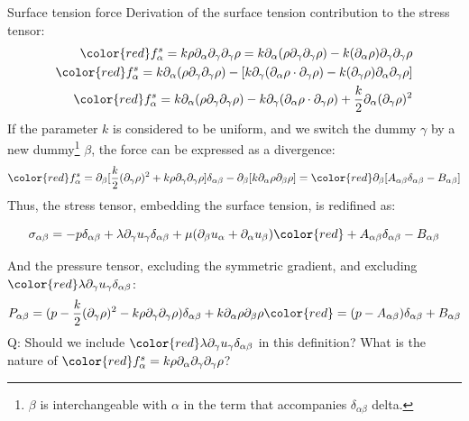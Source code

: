 \documentclass[8pt]{beamer}
\newcommand{\kronecker}{\delta_{\alpha \beta}}
\begin{document}
	\begin{frame}[t]{Surface tension force}
		Derivation of the surface tension contribution to the stress tensor: 
		\begin{equation*}
			\begin{split}
				{\color{red} f^s_\alpha} = k \rho \partial_\alpha \partial_\gamma \partial_\gamma \rho = k  \partial_\alpha (\rho \partial_\gamma \partial_\gamma \rho) - k (\partial_\alpha \rho) \partial_\gamma \partial_\gamma \rho\\
					 {\color{red} f^s_\alpha} = k  \partial_\alpha (\rho \partial_\gamma \partial_\gamma \rho) - [ k \partial_\gamma (\partial_\alpha \rho \cdot  \partial_\gamma \rho) - k (\partial_\gamma \rho) \partial_\alpha \partial_\gamma \rho  ]\\
					 {\color{red} f^s_\alpha} = k  \partial_\alpha (\rho \partial_\gamma \partial_\gamma \rho) - k \partial_\gamma (\partial_\alpha \rho \cdot  \partial_\gamma \rho) + \frac{k}{2} \partial_\alpha (\partial_\gamma \rho)^2
			\end{split}
		\end{equation*}
		If the parameter $k$ is considered to be uniform, and we switch the dummy $\gamma$ by a new dummy\footnote{$\beta$ is interchangeable with $\alpha$ in the term that accompanies $\kronecker$ delta.} $\beta$, the force can be expressed as a divergence: 
		\begin{equation*}
			\begin{split}
			 {\color{red} f^s_\alpha} = \partial_\beta [\frac{k}{2}(\partial_\gamma \rho)^2 + k \rho \partial_\gamma \partial_\gamma \rho ] \kronecker - \partial_\beta [k \partial_\alpha \rho \partial_\beta \rho] =
			  {\color{red} \partial_\beta [A_{\alpha\beta} \kronecker - B_{\alpha\beta}]} 
			\end{split}
		\end{equation*}
		Thus, the stress tensor, embedding the surface tension, is redifined as:
		
		\begin{equation*}
			\sigma_{\alpha\beta} = -p \kronecker + \lambda \partial_\gamma u_\gamma \kronecker + \mu (\partial_\beta u_\alpha + \partial_\alpha u_\beta) \color{red} + A_{\alpha\beta} \kronecker - B_{\alpha\beta}
		\end{equation*}
		 
		 And the pressure tensor, excluding the symmetric gradient, and excluding $ \color{red} \lambda \partial_\gamma u_\gamma \kronecker$:
		 \begin{equation*}
		 	P_{\alpha\beta} = (p - \frac{k}{2}(\partial_\gamma \rho)^2 - k \rho \partial_\gamma \partial_\gamma \rho) \kronecker + k \partial_\alpha \rho \partial_\beta \rho  \color{red} = (p-A_{\alpha\beta}) \kronecker + B_{\alpha\beta}
		 \end{equation*}
	 	Q: Should we include $ \color{red} \lambda \partial_\gamma u_\gamma \kronecker$ in this definition? What is the nature of ${\color{red} f^s_\alpha} = k \rho \partial_\alpha \partial_\gamma \partial_\gamma \rho$?
	\end{frame}
	
\end{document}
